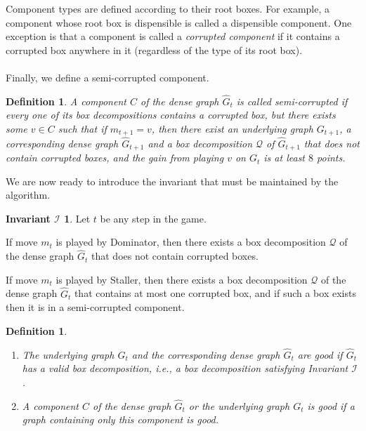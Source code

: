 \documentclass[11pt]{article}
\def\dnsitem{\vspace{-7pt}\item}
\newtheorem{definition}[theorem]{Definition}
\theoremstyle{definition}
\def\invboxes{\mathcal{I}}
\newtheorem*{tinvboxes*}{Invariant $\invboxes$}
\def\invboxesdom{\mathcal{I}_D}
\def\invboxesstaller{\mathcal{I}_S}
\begin{document}
Component types are defined according to their root boxes. 
For example, a component whose root box is dispensible is called a dispensible component. 
One exception is that a component is called a \emph{corrupted component} if it contains a corrupted box anywhere in it (regardless of the type of its root box).

\paragraph{}
Finally, we define a semi-corrupted component.

\begin{definition}
A component $C$ of the dense graph $\hat{G}_t$ is called \emph{semi-corrupted} if every one of its box decompositions contains a corrupted box, 
but there exists some $v \in C$ such that if $m_{t+1} = v$, then there exist an underlying graph $G_{t+1}$, a corresponding dense graph $\hat{G}_{t+1}$ and a box decomposition $\mathcal{Q}$ of $\hat{G}_{t+1}$ that does not contain corrupted boxes, and the gain from playing $v$ on $G_t$ is at least $8$ points.
\end{definition}

We are now ready to introduce the invariant that must be maintained by the algorithm.

\begin{tinvboxes*}
Let $t$ be any step in the game.
\begin{description}
	\dnsitem[$\invboxesdom$.] If move $m_t$ is played by Dominator, then there exists a box decomposition $\mathcal{Q}$ of the dense graph $\hat{G}_t$ that does not contain corrupted boxes.
	\dnsitem[$\invboxesstaller$.] If move $m_t$ is played by Staller, then there exists a box decomposition $\mathcal{Q}$ of the dense graph $\hat{G}_t$ that contains at most one corrupted box, 
	and if such a box exists then it is in a semi-corrupted component.
\end{description}
\end{tinvboxes*}

\begin{definition}
\label{def:good_graph_valid_box_decomp}
$ $
\begin{enumerate}
	\dnsitem The underlying graph $G_t$ and the corresponding dense graph $\hat{G}_t$ are \emph{good} if $\hat{G}_t$ has a \emph{valid} box decomposition, i.e., a box decomposition satisfying Invariant $\invboxes$.
	\dnsitem A component $C$ of the dense graph $\hat{G}_t$ or the underlying graph $G_t$ is \emph{good} if a graph containing only this component is good.
\end{enumerate}
\end{definition}
\end{document}
